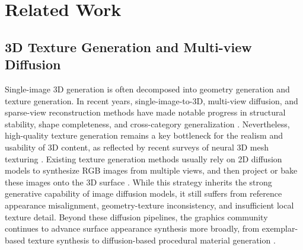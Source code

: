 \documentclass[times,twocolumn,final]{elsarticle}
\begin{document}
\section{Related Work}
\label{sec:related}

\subsection{3D Texture Generation and Multi-view Diffusion}
\label{subsec:3dtex}

Single-image 3D generation is often decomposed into geometry generation and texture generation. In recent years, single-image-to-3D, multi-view diffusion, and sparse-view reconstruction methods have made notable progress in structural stability, shape completeness, and cross-category generalization \cite{liu2023zero1to3,shi2023zero123pp,liu2023syncdreamer,long2023wonder3d,shi2024mvdream,wang2023imagedream,xu2024instantmesh,ke2024era3d}. Nevertheless, high-quality texture generation remains a key bottleneck for the realism and usability of 3D content, as reflected by recent surveys of neural 3D mesh texturing \cite{perla2026survey}. Existing texture generation methods usually rely on 2D diffusion models to synthesize RGB images from multiple views, and then project or bake these images onto the 3D surface \cite{chen2023text2tex,richardson2023texture,poole2023dreamfusion,chen2023fantasia3d}. While this strategy inherits the strong generative capability of image diffusion models, it still suffers from reference appearance misalignment, geometry-texture inconsistency, and insufficient local texture detail. Beyond these diffusion pipelines, the graphics community continues to advance surface appearance synthesis more broadly, from exemplar-based texture synthesis \cite{guzman2026adaptive} to diffusion-based procedural material generation \cite{lv2025interpretable}.
\end{document}
